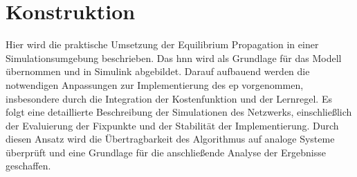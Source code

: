 \newpage

\section{Konstruktion}

Hier wird die praktische Umsetzung der Equilibrium Propagation in einer Simulationsumgebung beschrieben. Das \ac{hnn} wird als Grundlage für das Modell übernommen und in Simulink abgebildet. Darauf aufbauend werden die notwendigen Anpassungen zur Implementierung des \ac{ep} vorgenommen, insbesondere durch die Integration der Kostenfunktion und der Lernregel. Es folgt eine detaillierte Beschreibung der Simulationen des Netzwerks, einschließlich der Evaluierung der Fixpunkte und der Stabilität der Implementierung. Durch diesen Ansatz wird die Übertragbarkeit des Algorithmus auf analoge Systeme überprüft und eine Grundlage für die anschließende Analyse der Ergebnisse geschaffen.



